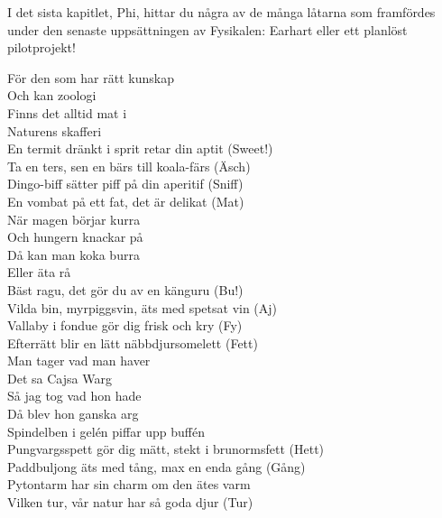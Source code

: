 \documentclass[a6paper, 10pt, twoside]{article}
\begin{document}
\noindent
{}
\small
\vspace{10pt}

\noindent
\small
I det sista kapitlet, Phi, hittar du några av de många låtarna som framfördes under den senaste uppsättningen av Fysikalen: Earhart eller ett planlöst pilotprojekt!\\


\begin{center}
\end{center}
\begin{lyrics}
För den som har rätt kunskap\\
Och kan zoologi\\
Finns det alltid mat i\\
Naturens skafferi
\vspace{5pt}\\
En termit dränkt i sprit retar din aptit (Sweet!)\\
Ta en ters, sen en bärs till koala-färs (Äsch)\\
Dingo-biff sätter piff på din aperitif (Sniff)\\
En vombat på ett fat, det är delikat (Mat)
\vspace{5pt}\\
När magen börjar kurra\\
Och hungern knackar på\\
Då kan man koka burra\\
Eller äta rå
\vspace{5pt}\\
Bäst ragu, det gör du av en känguru (Bu!)\\
Vilda bin, myrpiggsvin, äts med spetsat vin (Aj)\\
Vallaby i fondue gör dig frisk och kry (Fy)\\
Efterrätt blir en lätt näbbdjursomelett (Fett)
\vspace{5pt}\\
Man tager vad man haver\\
Det sa Cajsa Warg\\
Så jag tog vad hon hade\\
Då blev hon ganska arg
\vspace{5pt}\\
Spindelben i gelén piffar upp buffén\\
Pungvargsspett gör dig mätt, stekt i brunormsfett (Hett)\\
Paddbuljong äts med tång, max en enda gång (Gång)\\
Pytontarm har sin charm om den ätes varm\\
Vilken tur, vår natur har så goda djur (Tur)
\end{lyrics}
\end{document}
